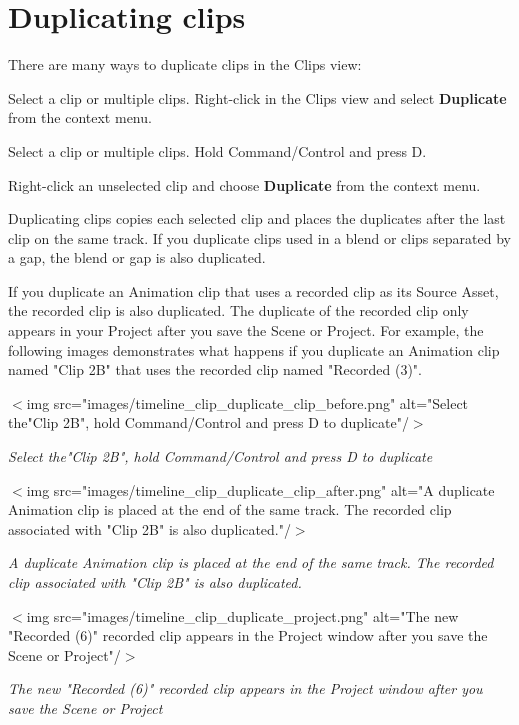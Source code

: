 \chapter{Duplicating clips}
\hypertarget{md__hey_tea_9_2_library_2_package_cache_2com_8unity_8timeline_0d1_87_85_2_documentation_0i_2clp__dup}{}\label{md__hey_tea_9_2_library_2_package_cache_2com_8unity_8timeline_0d1_87_85_2_documentation_0i_2clp__dup}
\label{md__hey_tea_9_2_library_2_package_cache_2com_8unity_8timeline_0d1_87_85_2_documentation_0i_2clp__dup_autotoc_md4610}%
%
 There are many ways to duplicate clips in the Clips view\+:


\begin{DoxyItemize}
\item Select a clip or multiple clips. Right-\/click in the Clips view and select {\bfseries{Duplicate}} from the context menu.
\item Select a clip or multiple clips. Hold Command/\+Control and press D.
\item Right-\/click an unselected clip and choose {\bfseries{Duplicate}} from the context menu.
\end{DoxyItemize}

Duplicating clips copies each selected clip and places the duplicates after the last clip on the same track. If you duplicate clips used in a blend or clips separated by a gap, the blend or gap is also duplicated.

If you duplicate an Animation clip that uses a recorded clip as its Source Asset, the recorded clip is also duplicated. The duplicate of the recorded clip only appears in your Project after you save the Scene or Project. For example, the following images demonstrates what happens if you duplicate an Animation clip named "{}\+Clip 2\+B"{} that uses the recorded clip named "{}\+Recorded (3)"{}.

\texorpdfstring{$<$}{<}img src="{}images/timeline\+\_\+clip\+\_\+duplicate\+\_\+clip\+\_\+before.\+png"{} alt="{}\+Select the"{}Clip 2B"{}, hold Command/\+Control and press D to duplicate"{}/\texorpdfstring{$>$}{>}

{\itshape Select the"{}\+Clip 2\+B"{}, hold Command/\+Control and press D to duplicate}

\texorpdfstring{$<$}{<}img src="{}images/timeline\+\_\+clip\+\_\+duplicate\+\_\+clip\+\_\+after.\+png"{} alt="{}\+A duplicate Animation clip is placed at the end of the same track. The recorded clip associated with "{}Clip 2B"{} is also duplicated."{}/\texorpdfstring{$>$}{>}

{\itshape A duplicate Animation clip is placed at the end of the same track. The recorded clip associated with "{}\+Clip 2\+B"{} is also duplicated.}

\texorpdfstring{$<$}{<}img src="{}images/timeline\+\_\+clip\+\_\+duplicate\+\_\+project.\+png"{} alt="{}\+The new "{}Recorded (6)"{} recorded clip appears in the Project window after you save the Scene or Project"{}/\texorpdfstring{$>$}{>}

{\itshape The new "{}\+Recorded (6)"{} recorded clip appears in the Project window after you save the Scene or Project} 